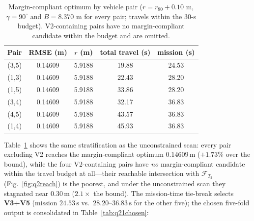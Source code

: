 \begin{table}[!htb]\centering\small
\setlength{\tabcolsep}{4.5pt}
\caption{Margin-compliant optimum by vehicle pair ($r=r_{80}+0.10$ m,
$\gamma=90^\circ$ and $B=8.370$ m for every pair; travels within the 30-s budget).
V2-containing pairs have no margin-compliant candidate within the budget and are
omitted.}
\label{tab:q21pairs}
\begin{tabular}{ccccc}
\toprule
Pair & RMSE (m) & $r$ (m) & total travel (s) & mission (s) \\
\midrule
(3,5) & 0.14609 & 5.9188 & 19.88 & 24.53 \\
(1,3) & 0.14609 & 5.9188 & 22.43 & 28.20 \\
(1,5) & 0.14609 & 5.9188 & 33.86 & 28.20 \\
(3,4) & 0.14609 & 5.9188 & 32.17 & 36.83 \\
(4,5) & 0.14609 & 5.9188 & 43.57 & 36.83 \\
(1,4) & 0.14609 & 5.9188 & 45.93 & 36.83 \\
\bottomrule
\end{tabular}
\end{table}

Table~\ref{tab:q21pairs} shows the same stratification as the unconstrained scan:
every pair excluding V2 reaches the margin-compliant optimum
$0.14609\,\mathrm{m}$ ($+1.73\%$ over the bound), while the four V2-containing pairs
have \emph{no} margin-compliant candidate within the travel budget at all---their
reachable intersection with $\mathcal{F}_{T_2}$ (Fig.~\ref{fig:q2reach}) is the
poorest, and under the unconstrained scan they stagnated near $0.30\,\mathrm{m}$
($2.1\times$ the bound). The mission-time tie-break selects \textbf{V3+V5}
(mission $24.53\,\mathrm{s}$ vs.\ $28.20$--$36.83\,\mathrm{s}$ for the other five);
the chosen five-fold output is consolidated in Table~\ref{tab:q21chosen}:


